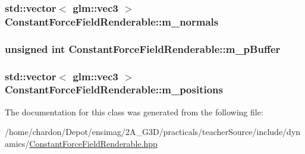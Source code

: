 \hypertarget{classConstantForceFieldRenderable_a171dc24ba94fd9337d36758e8791cebb}{
\subsubsection[{m\+\_\+normals}]{\setlength{\rightskip}{0pt plus 5cm}std\+::vector$<$ glm\+::vec3 $>$ Constant\+Force\+Field\+Renderable\+::m\+\_\+normals\hspace{0.3cm}{\ttfamily [private]}}}\label{classConstantForceFieldRenderable_a171dc24ba94fd9337d36758e8791cebb}
\hypertarget{classConstantForceFieldRenderable_a170f25325d424be2a1533befc64b1648}{
\subsubsection[{m\+\_\+p\+Buffer}]{\setlength{\rightskip}{0pt plus 5cm}unsigned int Constant\+Force\+Field\+Renderable\+::m\+\_\+p\+Buffer\hspace{0.3cm}{\ttfamily [private]}}}\label{classConstantForceFieldRenderable_a170f25325d424be2a1533befc64b1648}
\hypertarget{classConstantForceFieldRenderable_adda5c978538c39f9ce237bc4914d0399}{
\subsubsection[{m\+\_\+positions}]{\setlength{\rightskip}{0pt plus 5cm}std\+::vector$<$ glm\+::vec3 $>$ Constant\+Force\+Field\+Renderable\+::m\+\_\+positions\hspace{0.3cm}{\ttfamily [private]}}}\label{classConstantForceFieldRenderable_adda5c978538c39f9ce237bc4914d0399}


The documentation for this class was generated from the following file\+:\begin{DoxyCompactItemize}
\item 
/home/chardon/\+Depot/ensimag/2\+A\+\_\+\+G3\+D/practicals/teacher\+Source/include/dynamics/\hyperlink{ConstantForceFieldRenderable_8hpp}{Constant\+Force\+Field\+Renderable.\+hpp}\end{DoxyCompactItemize}
